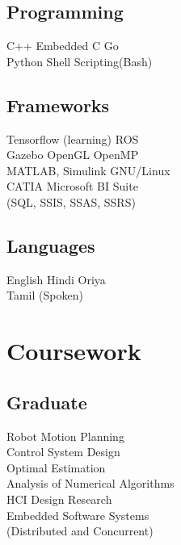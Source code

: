 \documentclass[]{deedy-resume-openfont}
\begin{document}
\begin{minipage}[t]{0.33\textwidth}
\sectionsep

\subsection{Programming}

C++ \textbullet{} Embedded C \textbullet{} Go\\
Python \textbullet{} Shell Scripting(Bash)

\sectionsep

\subsection{Frameworks}

Tensorflow (learning) \textbullet{} ROS \\
Gazebo \textbullet{}  OpenGL \textbullet{} OpenMP \\
MATLAB, Simulink \textbullet{}  GNU/Linux \\
CATIA \textbullet{} Microsoft BI Suite \\
(SQL, SSIS, SSAS, SSRS)\\

\sectionsep

\subsection{Languages}
English \textbullet{} Hindi \textbullet{} Oriya \\
Tamil (Spoken)


\sectionsep
\section{Coursework}

\sectionsep

\subsection{Graduate}
Robot Motion Planning\\
Control System Design\\
Optimal Estimation\\
Analysis of Numerical Algorithms\\
HCI Design Research\\
Embedded Software Systems\\
(Distributed and Concurrent)


\end{minipage}
\end{document}
